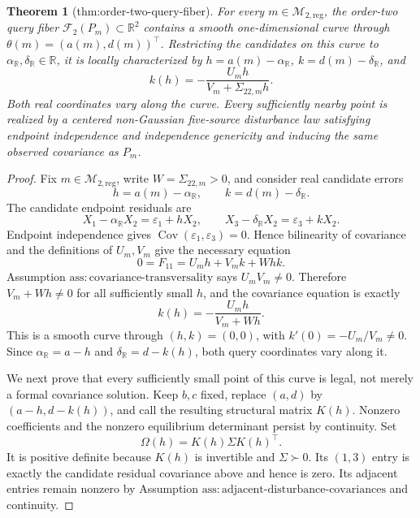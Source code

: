 \documentclass{article}
\newtheorem{theorem}{Theorem}
\begin{document}
\begin{theorem}[thm:order-two-query-fiber]\label{thm:order-two-query-fiber}
For every \(m\in\mathcal M_{2,\mathrm{reg}}\), the order-two query fiber \(\mathcal F_2(P_m)\subset\mathbb R^2\) contains a smooth one-dimensional curve through \(\theta(m)=(a(m),d(m))^\top\). Restricting the candidates on this curve to \(\alpha_{\mathbb R},\delta_{\mathbb R}\in\mathbb R\), it is locally characterized by \(h=a(m)-\alpha_{\mathbb R}\), \(k=d(m)-\delta_{\mathbb R}\), and \[k(h)=-\frac{U_mh}{V_m+\Sigma_{22,m}h}.\] Both real coordinates vary along the curve. Every sufficiently nearby point is realized by a centered non-Gaussian five-source disturbance law satisfying endpoint independence and independence genericity and inducing the same observed covariance as \(P_m\).
\end{theorem}
\begin{proof}
Fix \(m\in\mathcal M_{2,\mathrm{reg}}\), write \(W=\Sigma_{22,m}>0\), and consider real candidate errors
\[
h=a(m)-\alpha_{\mathbb R},
\qquad
k=d(m)-\delta_{\mathbb R}.
\]
The candidate endpoint residuals are
\[
X_1-\alpha_{\mathbb R}X_2=\varepsilon_1+hX_2,
\qquad
X_3-\delta_{\mathbb R}X_2=\varepsilon_3+kX_2.
\]
Endpoint independence gives \(\operatorname{Cov}(\varepsilon_1,\varepsilon_3)=0\). Hence bilinearity of covariance and the definitions of \(U_m,V_m\) give the necessary equation
\[
0=F_{11}=U_mh+V_mk+Whk.
\]
Assumption \(\mathrm{ass:covariance\mbox{-}transversality}\) says \(U_mV_m\neq0\). Therefore \(V_m+Wh\neq0\) for all sufficiently small \(h\), and the covariance equation is exactly
\[
k(h)=-\frac{U_mh}{V_m+Wh}.
\]
This is a smooth curve through \((h,k)=(0,0)\), with \(k'(0)=-U_m/V_m\neq0\). Since \(\alpha_{\mathbb R}=a-h\) and \(\delta_{\mathbb R}=d-k(h)\), both query coordinates vary along it.

We next prove that every sufficiently small point of this curve is legal, not merely a formal covariance solution. Keep \(b,c\) fixed, replace \((a,d)\) by \((a-h,d-k(h))\), and call the resulting structural matrix \(K(h)\). Nonzero coefficients and the nonzero equilibrium determinant persist by continuity. Set
\[
\Omega(h)=K(h)\Sigma K(h)^\top.
\]
It is positive definite because \(K(h)\) is invertible and \(\Sigma\succ0\). Its \((1,3)\) entry is exactly the candidate residual covariance above and hence is zero. Its adjacent entries remain nonzero by Assumption \(\mathrm{ass:adjacent\mbox{-}disturbance\mbox{-}covariances}\) and continuity.


\end{proof}
\end{document}
